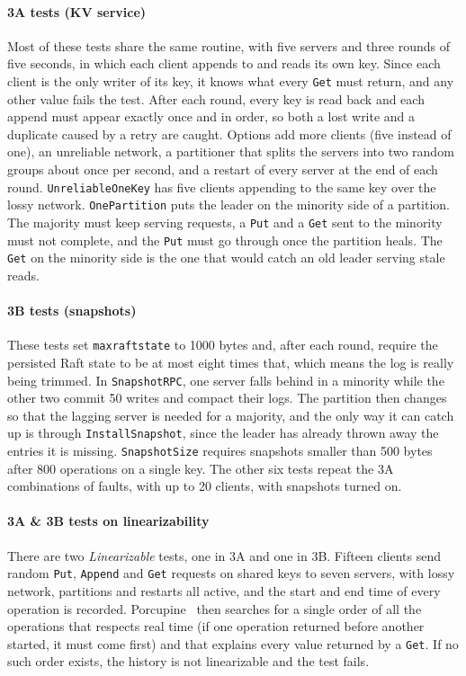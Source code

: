 \documentclass[conference]{IEEEtran}
\begin{document}
\paragraph{3A tests (KV service)} Most of these tests share the same routine, with five servers and three rounds of five seconds, in which each client appends to and reads its own key. Since each client is the only writer of its key, it knows what every \texttt{Get} must return, and any other value fails the test. After each round, every key is read back and each append must appear exactly once and in order, so both a lost write and a duplicate caused by a retry are caught. Options add more clients (five instead of one), an unreliable network, a partitioner that splits the servers into two random groups about once per second, and a restart of every server at the end of each round. \texttt{UnreliableOneKey} has five clients appending to the same key over the lossy network. \texttt{OnePartition} puts the leader on the minority side of a partition. The majority must keep serving requests, a \texttt{Put} and a \texttt{Get} sent to the minority must not complete, and the \texttt{Put} must go through once the partition heals. The \texttt{Get} on the minority side is the one that would catch an old leader serving stale reads.

\paragraph{3B tests (snapshots)} These tests set \texttt{maxraftstate} to 1000 bytes and, after each round, require the persisted Raft state to be at most eight times that, which means the log is really being trimmed. In \texttt{SnapshotRPC}, one server falls behind in a minority while the other two commit 50 writes and compact their logs. The partition then changes so that the lagging server is needed for a majority, and the only way it can catch up is through \texttt{InstallSnapshot}, since the leader has already thrown away the entries it is missing. \texttt{SnapshotSize} requires snapshots smaller than 500 bytes after 800 operations on a single key. The other six tests repeat the 3A combinations of faults, with up to 20 clients, with snapshots turned on.

\paragraph{3A \& 3B tests on linearizability} There are two \emph{Linearizable} tests, one in 3A and one in 3B. Fifteen clients send random \texttt{Put}, \texttt{Append} and \texttt{Get} requests on shared keys to seven servers, with lossy network, partitions and restarts all active, and the start and end time of every operation is recorded. Porcupine~\cite{porcupine} then searches for a single order of all the operations that respects real time (if one operation returned before another started, it must come first) and that explains every value returned by a \texttt{Get}. If no such order exists, the history is not linearizable and the test fails.
\end{document}
